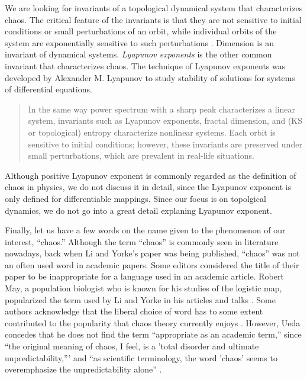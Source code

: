 \documentclass[10pt,twoside]{book}
\begin{document}
We are looking for invariants of a topological dynamical system that characterizes chaos.
The critical feature of the invariants is that they are not sensitive to initial conditions or small perturbations of an orbit, while individual orbits of the system are exponentially sensitive to such perturbations \citep{abarbanel}. %
Dimension is an invariant of dynamical systems.
\textit{Lyapunov exponents} is the other common invariant that characterizes chaos.
The technique of Lyapunov exponents was developed by Alexander M. Lyapunov to study stability of solutions for systems of differential equations.
\begin{quote}
  In the same way power spectrum with a sharp peak characterizes a linear system, invariants such as Lyapunov exponents, fractal dimension, and (KS or topological) entropy characterize nonlinear systems.
  Each orbit is sensitive to initial conditions; however, these invariants are preserved under small perturbations, which are prevalent in real-life situations.
\end{quote}
Although positive Lyapunov exponent is commonly regarded as the definition of chaos \citep{kantz-schreiber} in physics, we do not discuss it in detail, since the Lyapunov exponent is only defined for differentiable mappings.
Since our focus is on topolgical dynamics, we do not go into a great detail explaning Lyapunov exponent.


Finally, let us have a few words on the name given to the phenomenon of our interest, ``chaos.''
Although the term ``chaos'' is commonly seen in literature nowadays, back when Li and Yorke's paper was being published, ``chaos'' was not an often used word in academic papers.
Some editors considered the title of their paper to be inappropriate for a language used in an academic article.
Robert May, a population biologist who is known for his studies of the logistic map, popularized the term used by Li and Yorke in his articles \citeyearpar{may1,may2} and talks \citep[p.205]{ueda-abraham}.
Some authors acknowledge that the liberal choice of word has to some extent contributed to the popularity that chaos theory currently enjoys \citep[``Exploring Chaos on an Interval'']{ueda-abraham}.
However, Ueda concedes that he does not find the term ``appropriate as an academic term,'' since ``the original meaning of chaos, I feel, is a 'total disorder and ultimate unpredictability,''' and ``as scientific terminology, the word 'chaos' seems to overemphasize the unpredictability alone'' \citet[p.24]{ueda-abraham}.
\end{document}
